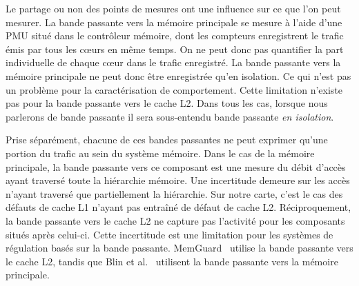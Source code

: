 Le partage ou non des points de mesures ont une influence sur ce que l'on peut mesurer.
La bande passante vers la mémoire principale se mesure à l'aide d'une PMU situé dans le contrôleur mémoire, dont les compteurs enregistrent le trafic émis par tous les cœurs en même temps.
On ne peut donc pas quantifier la part individuelle de chaque cœur dans le trafic enregistré.
La bande passante vers la mémoire principale ne peut donc être enregistrée qu'en isolation.
Ce qui n'est pas un problème pour la caractérisation de comportement.
Cette limitation n'existe pas pour la bande passante vers le cache L2.
Dans tous les cas, lorsque nous parlerons de bande passante il sera sous-entendu bande passante \emph{en isolation}.

Prise séparément, chacune de ces bandes passantes ne peut exprimer qu'une portion du trafic au sein du système mémoire.
Dans le cas de la mémoire principale, la bande passante vers ce composant est une mesure du débit d'accès ayant traversé toute la hiérarchie mémoire.
Une incertitude demeure sur les accès n'ayant traversé que partiellement la hiérarchie.
Sur notre carte, c'est le cas des défauts de cache L1 n'ayant pas entraîné de défaut de cache L2.
Réciproquement, la bande passante vers le cache L2 ne capture pas l'activité pour les composants situés après celui-ci.
Cette incertitude est une limitation pour les systèmes de régulation basés sur la bande passante.
MemGuard~\cite{yun2013memguard} utilise la bande passante vers le cache L2, tandis que Blin et al.~\cite{blin2016maximizing} utilisent la bande passante vers la mémoire principale.



